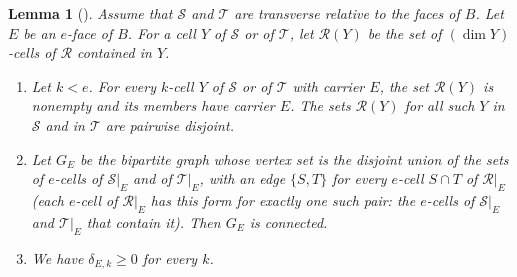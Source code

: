 \documentclass[11pt]{article}
\newtheorem{lemma}[theorem]{Lemma}
\theoremstyle{definition}
\theoremstyle{remark}
\newcommand{\SSS}{\mathcal S}
\newcommand{\TT}{\mathcal T}
\newcommand{\RR}{\mathcal R}
\begin{document}
\begin{lemma}[{\cite[proof of Lemma~4.3, Steps~1--2]{Fourier}}]\label{lem:carrier}
Assume that $\SSS$ and $\TT$ are transverse relative to the faces of $B$.
Let $E$ be an $e$-face of $B$. For a cell $Y$ of $\SSS$ or of $\TT$, let $\RR(Y)$ be the set of
$(\dim Y)$-cells of $\RR$ contained in $Y$.
\begin{enumerate}
\item[(i)] Let $k<e$. For every $k$-cell $Y$ of $\SSS$ or of $\TT$ with
carrier $E$, the set $\RR(Y)$ is nonempty and its members have carrier
$E$. The sets $\RR(Y)$ for all such $Y$ in $\SSS$ and in $\TT$ are pairwise disjoint.
\item[(ii)] Let $G_E$ be the bipartite graph whose vertex set is the
disjoint union of the sets of $e$-cells of $\SSS|_E$ and of $\TT|_E$, with an edge $\{S,T\}$ for
every $e$-cell $S\cap T$ of $\RR|_E$ (each $e$-cell of $\RR|_E$ has this form for exactly one such
pair: the $e$-cells of $\SSS|_E$ and $\TT|_E$ that contain it). Then $G_E$ is connected.
\item[(iii)] We have $\delta_{E,k}\geq0$ for every $k$.
\end{enumerate}
\end{lemma}
\end{document}
